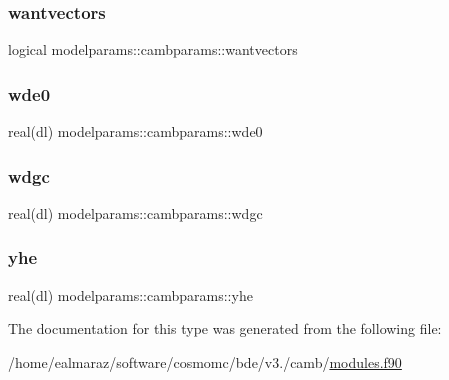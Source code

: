 \subsubsection{\texorpdfstring{wantvectors}{wantvectors}}
{\footnotesize\ttfamily logical modelparams\+::cambparams\+::wantvectors}

\mbox{\label{structmodelparams_1_1cambparams_aee77725f02becd9f9747c9ce966efa95}} 
\subsubsection{\texorpdfstring{wde0}{wde0}}
{\footnotesize\ttfamily real(dl) modelparams\+::cambparams\+::wde0}

\mbox{\label{structmodelparams_1_1cambparams_a78bfb376426165469779c263a1d7bf9a}} 
\subsubsection{\texorpdfstring{wdgc}{wdgc}}
{\footnotesize\ttfamily real(dl) modelparams\+::cambparams\+::wdgc}

\mbox{\label{structmodelparams_1_1cambparams_a860e64699c36b01374c88a2ace1a3de2}} 
\subsubsection{\texorpdfstring{yhe}{yhe}}
{\footnotesize\ttfamily real(dl) modelparams\+::cambparams\+::yhe}



The documentation for this type was generated from the following file\+:\begin{DoxyCompactItemize}
\item 
/home/ealmaraz/software/cosmomc/bde/v3./camb/\mbox{\hyperlink{modules_8f90}{modules.\+f90}}\end{DoxyCompactItemize}
